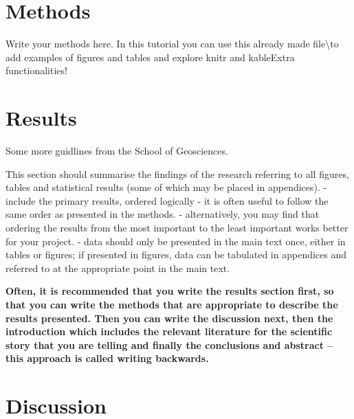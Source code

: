 \documentclass[
  11pt,
]{article}
\begin{document}
\begin{centering}
\newpage

\hypertarget{methods}{%
\section{Methods}\label{methods}}

\vspace{0.5cm}

Write your methods here. In this tutorial you can use this already made
file\textbackslash to add examples of figures and tables and explore
knitr and kableExtra functionalities! \newpage

\hypertarget{results}{%
\section{Results}\label{results}}

Some more guidlines from the School of Geosciences.

This section should summarise the findings of the research referring to
all figures, tables and statistical results (some of which may be placed
in appendices). - include the primary results, ordered logically - it is
often useful to follow the same order as presented in the methods. -
alternatively, you may find that ordering the results from the most
important to the least important works better for your project. - data
should only be presented in the main text once, either in tables or
figures; if presented in figures, data can be tabulated in appendices
and referred to at the appropriate point in the main text.

\textbf{Often, it is recommended that you write the results section
first, so that you can write the methods that are appropriate to
describe the results presented. Then you can write the discussion next,
then the introduction which includes the relevant literature for the
scientific story that you are telling and finally the conclusions and
abstract -- this approach is called writing backwards.} \newpage

\hypertarget{discussion}{%
\section{Discussion}\label{discussion}}


\end{centering}
\end{document}
